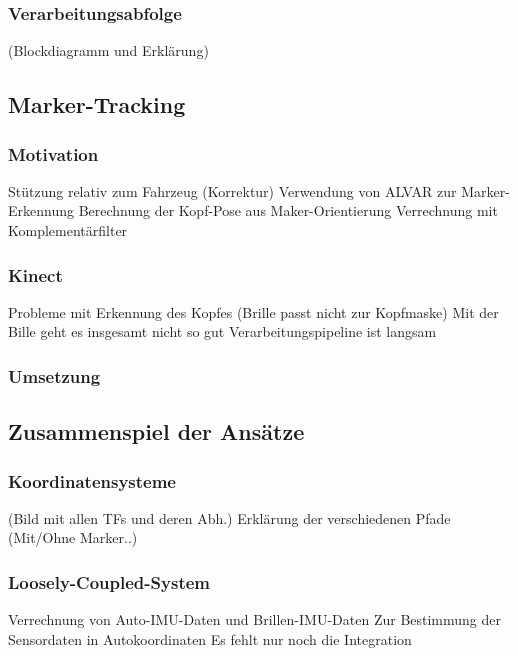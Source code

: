 \subsubsection{Verarbeitungsabfolge}
(Blockdiagramm und Erklärung)

\subsection{Marker-Tracking}
\subsubsection{Motivation}
Stützung relativ zum Fahrzeug (Korrektur) Verwendung von ALVAR zur Marker-Erkennung Berechnung der Kopf-Pose aus Maker-Orientierung Verrechnung mit Komplementärfilter
\subsubsection{Kinect}
Probleme mit Erkennung des Kopfes (Brille passt nicht zur Kopfmaske) Mit der Bille geht es insgesamt nicht so gut Verarbeitungspipeline ist langsam
\subsubsection{Umsetzung}

\subsection{Zusammenspiel der Ansätze}
\subsubsection{Koordinatensysteme}
(Bild mit allen TFs und deren Abh.) Erklärung der verschiedenen Pfade (Mit/Ohne Marker..)
\subsubsection{Loosely-Coupled-System}
Verrechnung von Auto-IMU-Daten und Brillen-IMU-Daten Zur Bestimmung der Sensordaten in Autokoordinaten Es fehlt nur noch die Integration

